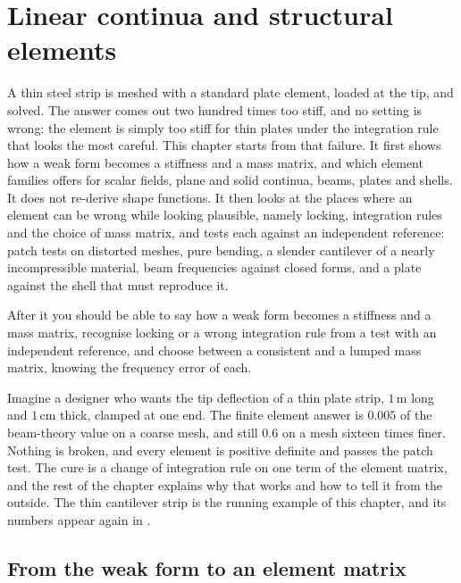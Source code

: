 \chapter{Linear continua and structural elements}\label{ch:elem}

\begin{tcolorbox}[colback=gray!5,colframe=gray!50,title={In this chapter}]
A thin steel strip is meshed with a standard plate element, loaded at the tip, and solved. The answer comes out two hundred times too stiff, and no setting is wrong: the element is simply too stiff for thin plates under the integration rule that looks the most careful. This chapter starts from that failure. It first shows how a weak form becomes a stiffness and a mass matrix, and which element families \fea{} offers for scalar fields, plane and solid continua, beams, plates and shells. It does not re-derive shape functions. It then looks at the places where an element can be wrong while looking plausible, namely locking, integration rules and the choice of mass matrix, and tests each against an independent reference: patch tests on distorted meshes, pure bending, a slender cantilever of a nearly incompressible material, beam frequencies against closed forms, and a plate against the shell that must reproduce it.\par\smallskip
After it you should be able to say how a weak form becomes a stiffness and a mass matrix, recognise locking or a wrong integration rule from a test with an independent reference, and choose between a consistent and a lumped mass matrix, knowing the frequency error of each.
\end{tcolorbox}

Imagine a designer who wants the tip deflection of a thin plate strip, $1\,\mathrm{m}$ long and $1\,\mathrm{cm}$ thick, clamped at one end. The finite element answer is $0.005$ of the beam-theory value on a coarse mesh, and still $0.6$ on a mesh sixteen times finer. Nothing is broken, and every element is positive definite and passes the patch test. The cure is a change of integration rule on one term of the element matrix, and the rest of the chapter explains why that works and how to tell it from the outside. The thin cantilever strip is the running example of this chapter, and its numbers appear again in .

\section{From the weak form to an element matrix}\label{sec:el-weak}

